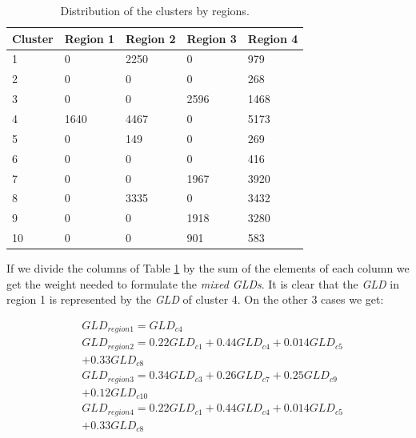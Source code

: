 \begin{table}
\begin{center}
    \begin{tabular}{|l|l|l|l|l|}
    \hline
    \textbf{Cluster} & \textbf{Region 1} &  \textbf{Region 2} &  \textbf{Region 3} &   \textbf{Region 4}  \\ \hline
    1     & 0   		& 2250 & 0 & 979            \\ \hline
    2     & 0   		& 0 & 0 & 268           \\ \hline
    3     & 0      	& 0 & 2596 & 1468       \\ \hline
    4     & 1640	& 4467 & 0 & 5173         \\ \hline
    5     & 0       & 149 & 0 & 269          \\ \hline
    6     & 0     & 0 & 0 & 416           \\ \hline
    7     & 0       & 0 & 1967 & 3920           \\ \hline
    8     & 0     & 3335 & 0 & 3432             \\ \hline
    9     & 0      & 0 & 1918 & 3280       \\ \hline
    10   & 0      & 0 & 901 & 583         \\ \hline
    \end{tabular}
    \caption {Distribution of the clusters by regions.}
    \label{tab:distribution_of_the_clusters_by_regions}
    \end{center}
\end{table}

If we divide the columns of Table \ref{tab:distribution_of_the_clusters_by_regions} by the sum of the elements of each column we get the weight needed to formulate the \textit{mixed GLDs}. It is clear that the \textit{GLD} in region 1 is represented by the \textit{GLD} of cluster 4. On the other 3 cases we get:

\begin{equation*}\label{eq:pareto mle2}
  \begin{aligned}
& GLD_{region1} = GLD_{c4} \\
& GLD_{region2} = 0.22GLD_{c1} + 0.44GLD_{c4} + 0.014GLD_{c5} \\
& + 0.33GLD_{c8} \\
& GLD_{region3} = 0.34GLD_{c3} + 0.26GLD_{c7} + 0.25GLD_{c9} \\
& + 0.12GLD_{c10} \\
& GLD_{region4} = 0.22GLD_{c1} + 0.44GLD_{c4} + 0.014GLD_{c5} \\ 
& + 0.33GLD_{c8}
\end{aligned}
\end{equation*}

